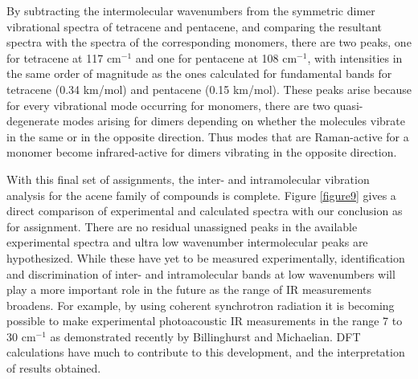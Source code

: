  By subtracting the intermolecular wavenumbers from the symmetric dimer vibrational spectra of tetracene and pentacene, and comparing the resultant spectra with the spectra of the corresponding monomers, there are two peaks, one for tetracene at 117 cm$^{-1}$ and one for pentacene at 108 cm$^{-1}$, with intensities in the same order of magnitude as the ones calculated for fundamental bands for tetracene (0.34 km/mol) and pentacene (0.15 km/mol). These peaks arise because for every vibrational mode occurring for monomers, there are two quasi-degenerate modes arising for dimers depending on whether the molecules vibrate in the same or in the opposite direction. Thus modes that are Raman-active for a monomer become infrared-active for dimers vibrating in the opposite direction. 
 
 With this final set of assignments, the inter- and intramolecular vibration analysis for the acene family of compounds is complete. Figure \ref{figure9} gives a direct comparison of experimental and calculated spectra with our conclusion as for assignment. There are no residual unassigned peaks in the available experimental spectra and ultra low wavenumber intermolecular peaks are hypothesized.  While these have yet to be measured experimentally, identification and discrimination of inter- and intramolecular bands at low wavenumbers will play a more important role in the future as the range of IR measurements broadens. For example, by using coherent synchrotron radiation it is becoming possible to make experimental photoacoustic IR measurements in the range 7 to 30 cm$^{-1}$ as demonstrated recently by Billinghurst and Michaelian\cite{billinghurst2010photoacoustic}. DFT calculations have much to contribute to this development, and the interpretation of results obtained.
 
